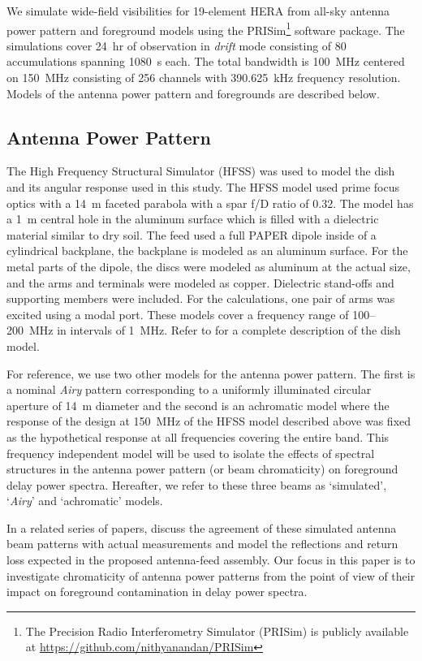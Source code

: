 \documentclass[preprint2,iop,numberedappendix,twocolappendix,appendixfloats]{emulateapj}
\begin{document}
We simulate wide-field visibilities for 19-element HERA from all-sky antenna power pattern and foreground models using the PRISim\footnote{The Precision Radio Interferometry Simulator (PRISim) is publicly available at \url{https://github.com/nithyanandan/PRISim}} software package. The simulations cover 24~hr of observation in {\it drift} mode consisting of 80 accumulations spanning 1080~s each. The total bandwidth is 100~MHz centered on 150~MHz consisting of 256 channels with 390.625~kHz frequency resolution. Models of the antenna power pattern and foregrounds are described below.

\subsection{Antenna Power Pattern}\label{sec:beam-model}

The High Frequency Structural Simulator (HFSS) was used to model the dish and its angular response used in this study. The HFSS model used prime focus optics with a 14~m faceted parabola with a spar f/D ratio of 0.32.  The model has a 1~m central hole in the aluminum surface which is filled with a dielectric material similar to dry soil. The feed used a full PAPER dipole inside of a cylindrical backplane, the backplane is modeled as an aluminum surface. For the metal parts of the dipole, the discs were modeled as aluminum at the actual size, and the arms and terminals were modeled as copper. Dielectric stand-offs and supporting members were included. For the calculations, one pair of arms was excited using a modal port. These models cover a frequency range of 100--200~MHz in intervals of 1~MHz. Refer to \citet{deb16} for a complete description of the dish model. 

For reference, we use two other models for the antenna power pattern. The first is a nominal {\it Airy} pattern corresponding to a uniformly illuminated circular aperture of 14~m diameter and the second is an achromatic model where the response of the design at 150~MHz of the HFSS model described above was fixed as the hypothetical response at all frequencies covering the entire band. This frequency independent model will be used to isolate the effects of spectral structures in the antenna power pattern (or beam chromaticity) on foreground delay power spectra. Hereafter, we refer to these three beams as `simulated', `{\it Airy}' and `achromatic' models.

In a related series of papers, \citet{neb16} discuss the agreement of these simulated antenna beam patterns with actual measurements and \citet{ewa16} model the reflections and return loss expected in the proposed antenna-feed assembly. Our focus in this paper is to investigate chromaticity of antenna power patterns from the point of view of their impact on foreground contamination in delay power spectra.
\end{document}
